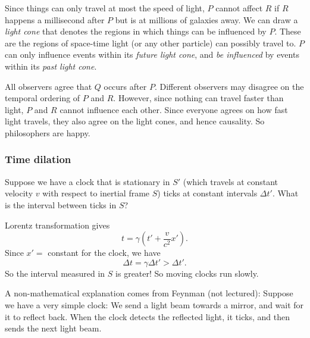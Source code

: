 \documentclass[a4paper]{article}
\begin{document}
Since things can only travel at most the speed of light, $P$ cannot affect $R$ if $R$ happens a millisecond after $P$ but is at millions of galaxies away. We can draw a \emph{light cone} that denotes the regions in which things can be influenced by $P$. These are the regions of space-time light (or any other particle) can possibly travel to. $P$ can only influence events within its \emph{future light cone}, and \emph{be influenced} by events within its \emph{past light cone}.
\begin{center}
\end{center}
All observers agree that $Q$ occurs after $P$. Different observers may disagree on the temporal ordering of $P$ and $R$. However, since nothing can travel faster than light, $P$ and $R$ cannot influence each other. Since everyone agrees on how fast light travels, they also agree on the light cones, and hence causality. So philosophers are happy.

\subsubsection*{Time dilation}
Suppose we have a clock that is stationary in $S'$ (which travels at constant velocity $v$ with respect to inertial frame $S$) ticks at constant intervals $\Delta t'$. What is the interval between ticks in $S$?

Lorentz transformation gives
\[
  t = \gamma\left(t' + \frac{v}{c^2}x'\right).
\]
Since $x' =$ constant for the clock, we have
\[
  \Delta t = \gamma \Delta t' > \Delta t'.
\]
So the interval measured in $S$ is greater! So moving clocks run slowly.

A non-mathematical explanation comes from Feynman (not lectured): Suppose we have a very simple clock: We send a light beam towards a mirror, and wait for it to reflect back. When the clock detects the reflected light, it ticks, and then sends the next light beam.
\end{document}
